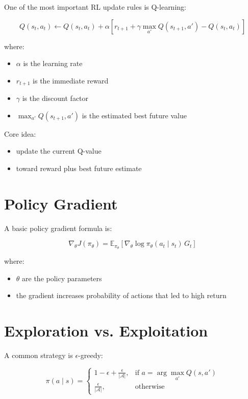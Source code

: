 \documentclass[11pt]{article}
\begin{document}
One of the most important RL update rules is Q-learning:

\[
Q(s_t,a_t) \leftarrow Q(s_t,a_t) +
\alpha \left[
r_{t+1} + \gamma \max_{a'} Q(s_{t+1},a') - Q(s_t,a_t)
\right]
\]

where:
\begin{itemize}
    \item $\alpha$ is the learning rate
    \item $r_{t+1}$ is the immediate reward
    \item $\gamma$ is the discount factor
    \item $\max_{a'} Q(s_{t+1},a')$ is the estimated best future value
\end{itemize}

Core idea:
\begin{itemize}
    \item update the current Q-value
    \item toward reward plus best future estimate
\end{itemize}

\section{Policy Gradient}

A basic policy gradient formula is:

\[
\nabla_{\theta} J(\pi_{\theta}) =
\mathbb{E}_{\pi_{\theta}}
\left[
\nabla_{\theta} \log \pi_{\theta}(a_t \mid s_t) \, G_t
\right]
\]

where:
\begin{itemize}
    \item $\theta$ are the policy parameters
    \item the gradient increases probability of actions that led to high return
\end{itemize}

\section{Exploration vs. Exploitation}

A common strategy is $\epsilon$-greedy:

\[
\pi(a \mid s) =
\begin{cases}
1 - \epsilon + \frac{\epsilon}{|\mathcal{A}|}, & \text{if } a = \arg\max_{a'} Q(s,a') \\
\frac{\epsilon}{|\mathcal{A}|}, & \text{otherwise}
\end{cases}
\]
\end{document}
